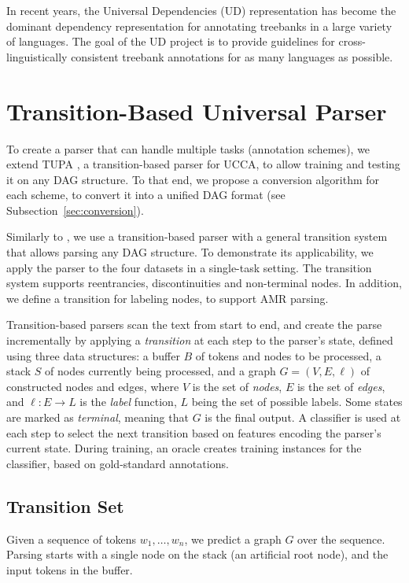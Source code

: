 \documentclass[11pt,a4paper]{article}
\begin{document}
In recent years, the Universal Dependencies
(UD) representation \cite{nivre2016universal,11234/1-2515} has become
the dominant dependency representation for
annotating treebanks in a large variety of languages.
The goal of the UD project is to provide
guidelines for cross-linguistically consistent treebank
annotations for as many languages as possible.



\section{Transition-Based Universal Parser}\label{sec:model}

To create a parser that can handle multiple tasks (annotation schemes),
we extend TUPA \cite{hershcovich2017a}, a transition-based parser for UCCA,
to allow training and testing it on any DAG structure.
To that end, we propose a conversion algorithm for each scheme,
to convert it into a unified DAG format (see Subsection~\ref{sec:conversion}).

Similarly to \citet{hershcovich2017a}, we use a transition-based parser
with a general transition system that allows parsing any DAG structure.
To demonstrate its applicability, we apply the parser to the four datasets
in a single-task setting.
The transition system supports reentrancies, discontinuities and non-terminal nodes.
In addition, we define a transition for labeling nodes, to support AMR parsing.

Transition-based parsers \cite{Nivre03anefficient} scan the text from start to end,
and create the parse incrementally by applying a \textit{transition}
at each step to the parser's state,
defined using three data structures: a buffer $B$ of tokens and nodes to be processed,
a stack $S$ of nodes currently being processed,
and a graph $G=(V,E,\ell)$ of constructed nodes and edges,
where $V$ is the set of \emph{nodes}, $E$ is the set of \emph{edges},
and $\ell : E \to L$ is the \emph{label} function, $L$ being the set of possible labels.
Some states are marked as \textit{terminal}, meaning that $G$ is the final output.
A classifier is used at each step to select the next transition based on features
encoding the parser's current state.
During training, an oracle creates training instances for the classifier,
based on gold-standard annotations.


\subsection{Transition Set}\label{sec:transition_set}
Given a sequence of tokens $w_1, \ldots, w_n$, we predict a graph $G$ over the sequence.
Parsing starts with a single node on the stack (an artificial root node), and the input tokens
in the buffer.
\end{document}

